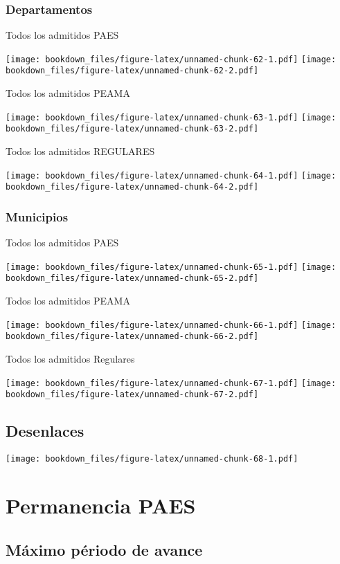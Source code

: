 \documentclass[]{article}
\theoremstyle{definition}
\theoremstyle{definition}
\theoremstyle{definition}
\theoremstyle{remark}
\begin{document}
\subsubsection{Departamentos}\label{departamentos}

Todos los admitidos PAES

\texttt{[image: bookdown\_files/figure-latex/unnamed-chunk-62-1.pdf]}
\texttt{[image: bookdown\_files/figure-latex/unnamed-chunk-62-2.pdf]}

Todos los admitidos PEAMA

\texttt{[image: bookdown\_files/figure-latex/unnamed-chunk-63-1.pdf]}
\texttt{[image: bookdown\_files/figure-latex/unnamed-chunk-63-2.pdf]}

Todos los admitidos REGULARES

\texttt{[image: bookdown\_files/figure-latex/unnamed-chunk-64-1.pdf]}
\texttt{[image: bookdown\_files/figure-latex/unnamed-chunk-64-2.pdf]}

\subsubsection{Municipios}\label{municipios}

Todos los admitidos PAES

\texttt{[image: bookdown\_files/figure-latex/unnamed-chunk-65-1.pdf]}
\texttt{[image: bookdown\_files/figure-latex/unnamed-chunk-65-2.pdf]}

Todos los admitidos PEAMA

\texttt{[image: bookdown\_files/figure-latex/unnamed-chunk-66-1.pdf]}
\texttt{[image: bookdown\_files/figure-latex/unnamed-chunk-66-2.pdf]}

Todos los admitidos Regulares

\texttt{[image: bookdown\_files/figure-latex/unnamed-chunk-67-1.pdf]}
\texttt{[image: bookdown\_files/figure-latex/unnamed-chunk-67-2.pdf]}

\subsection{Desenlaces}\label{desenlaces}

\texttt{[image: bookdown\_files/figure-latex/unnamed-chunk-68-1.pdf]}

\section{Permanencia PAES}\label{permanencia-paes}

\subsection{Máximo périodo de avance}\label{maximo-periodo-de-avance}
\end{document}
